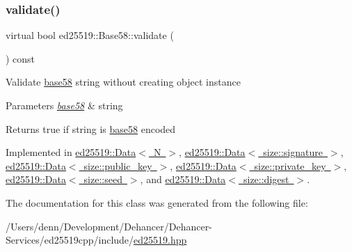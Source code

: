 \mbox{\label{classed25519_1_1_base58_addfdb1d6d0f7e7f0cd0cf5dd2ee193bb}} 
\subsubsection{\texorpdfstring{validate()}{validate()}}
{\footnotesize\ttfamily virtual bool ed25519\+::\+Base58\+::validate (\begin{DoxyParamCaption}{ }\end{DoxyParamCaption}) const\hspace{0.3cm}{\ttfamily [pure virtual]}}

Validate \mbox{\hyperlink{namespaceed25519_1_1base58}{base58}} string without creating object instance 
\begin{DoxyParams}{Parameters}
{\em \mbox{\hyperlink{namespaceed25519_1_1base58}{base58}}} & string \\
\hline
\end{DoxyParams}
\begin{DoxyReturn}{Returns}
true if string is \mbox{\hyperlink{namespaceed25519_1_1base58}{base58}} encoded 
\end{DoxyReturn}


Implemented in \mbox{\hyperlink{classed25519_1_1_data_ac365c9862b45379c677449b622c74da5}{ed25519\+::\+Data$<$ N $>$}}, \mbox{\hyperlink{classed25519_1_1_data_ac365c9862b45379c677449b622c74da5}{ed25519\+::\+Data$<$ size\+::signature $>$}}, \mbox{\hyperlink{classed25519_1_1_data_ac365c9862b45379c677449b622c74da5}{ed25519\+::\+Data$<$ size\+::public\+\_\+key $>$}}, \mbox{\hyperlink{classed25519_1_1_data_ac365c9862b45379c677449b622c74da5}{ed25519\+::\+Data$<$ size\+::private\+\_\+key $>$}}, \mbox{\hyperlink{classed25519_1_1_data_ac365c9862b45379c677449b622c74da5}{ed25519\+::\+Data$<$ size\+::seed $>$}}, and \mbox{\hyperlink{classed25519_1_1_data_ac365c9862b45379c677449b622c74da5}{ed25519\+::\+Data$<$ size\+::digest $>$}}.



The documentation for this class was generated from the following file\+:\begin{DoxyCompactItemize}
\item 
/\+Users/denn/\+Development/\+Dehancer/\+Dehancer-\/\+Services/ed25519cpp/include/\mbox{\hyperlink{ed25519_8hpp}{ed25519.\+hpp}}\end{DoxyCompactItemize}
